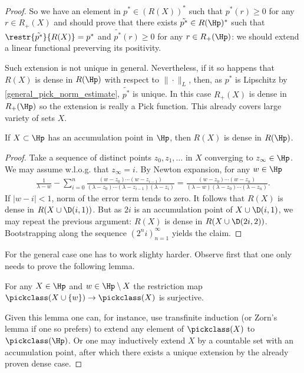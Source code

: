 \begin{proof}
	So we have an element in $p^{*} \in (R(X))^{*}$ such that $p^{*}(r) \geq 0$ for any $r \in R_{+}(X)$ and should prove that there exists $\tilde{p^{*}} \in R(\Hp)^{*}$ such that $\restr{\tilde{p^{*}}}{R(X)} = p^{*}$ and $\tilde{p^{*}}(r) \geq 0$ for any $r \in R_{+}(\Hp)$: we should extend a linear functional preverving its positivity.

	Such extension is not unique in general. Nevertheless, if it so happens that $R(X)$ is dense in $R(\Hp)$ with respect to $\|\cdot\|_{L}$, then, as $p^{*}$ is Lipschitz by \ref{general_pick_norm_estimate}, $\tilde{p^{*}}$ is unique. In this case $R_{+}(X)$ is dense in $R_{+}(\Hp)$ so the extension is really a Pick function. This already covers large variety of sets $X$.
	\begin{lem}\label{pick_dual_dense}
		If $X \subset \Hp$ has an accumulation point in $\Hp$, then $R(X)$ is dense in $R(\Hp)$.
	\end{lem}
	\begin{proof}
		Take a sequence of distinct points $z_{0}, z_{1}, \ldots$ in $X$ converging to $z_{\infty} \in \Hp$. We may assume w.l.o.g. that $z_{\infty} = i$. By Newton expansion, for any $w \in \Hp$
		\begin{align*}
			\frac{1}{\lambda - w} - \sum_{i = 0}^{n} \frac{(w - z_{0}) \cdots (w - z_{i - 1})}{(\lambda - z_{0}) \cdots (\lambda - z_{i - 1}) (\lambda - z_{i})} = \frac{(w - z_{0}) \cdots (w - z_{n})}{(\lambda - w)(\lambda - z_{0}) \cdots (\lambda - z_{n})}.
		\end{align*}
		If $|w - i| < 1$, norm of the error term tends to zero. It follows that $R(X)$ is dense in $R(X \cup \D(i, 1))$. But as $2 i$ is an accumulation point of $X \cup \D(i, 1)$, we may repeat the previous argument: $R(X)$ is dense in $R(X \cup \D(2 i, 2))$. Bootstrapping along the sequence $(2^{n} i)_{n = 1}^{\infty}$ yields the claim.
	\end{proof}
	For the general case one has to work slighty harder. Observe first that one only needs to prove the following lemma.
	\begin{lem}\label{pick_one_point_extension}
		For any $X \in \Hp$ and $w \in \Hp \setminus X$ the restriction map $\pickclass(X \cup \{w\}) \to \pickclass(X)$ is surjective.
	\end{lem}
	Given this lemma one can, for instance, use transfinite induction (or Zorn's lemma if one so prefers) to extend any element of $\pickclass(X)$ to $\pickclass(\Hp)$. Or one may inductively extend $X$ by a countable set with an accumulation point, after which there exists a unique extension by the already proven dense case.


\end{proof}
